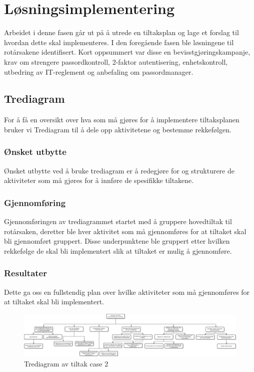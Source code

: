 \chapter{Løsningsimplementering}
Arbeidet i denne fasen går ut på å utrede en tiltaksplan og lage et forslag til hvordan dette skal implementeres. I den foregående fasen ble løsningene til rotårsakene identifisert. Kort oppsummert var disse en bevisstgjøringskampanje, krav om strengere passordkontroll, 2-faktor autentisering, enhetskontroll, utbedring av IT-reglement og anbefaling om passordmanager. 

\section{Trediagram}
For å få en oversikt over hva som må gjøres for å implementere tiltaksplanen bruker vi Trediagram til å dele opp aktivitetene og bestemme rekkefølgen. 

\subsection{Ønsket utbytte}
Ønsket utbytte ved å bruke trediagram er å redegjøre for og strukturere de aktiviteter som må gjøres for å innføre de spesifikke tiltakene. 

\subsection{Gjennomføring}
Gjennomføringen av trediagrammet startet med å gruppere hovedtiltak til rotårsaken, deretter ble hver aktivitet som må gjennomføres for at tiltaket skal bli gjennomført gruppert. Disse underpunktene ble gruppert etter hvilken rekkefølge de skal bli implementert slik at tiltaket er mulig å gjennomføre. 

\subsection{Resultater}
Dette ga oss en fullstendig plan over hvilke aktiviteter som må gjennomføres for at tiltaket skal bli implementert.

\begin{figure}[p] 
    \centering    
    \includegraphics[scale=0.4, angle=90]{case_2/bilder/trediagram.pdf}
    \caption[Trediagram av tiltak case 2]{Trediagram av tiltak case 2}
    \label{fig:trediagram-case2}
\end{figure}


